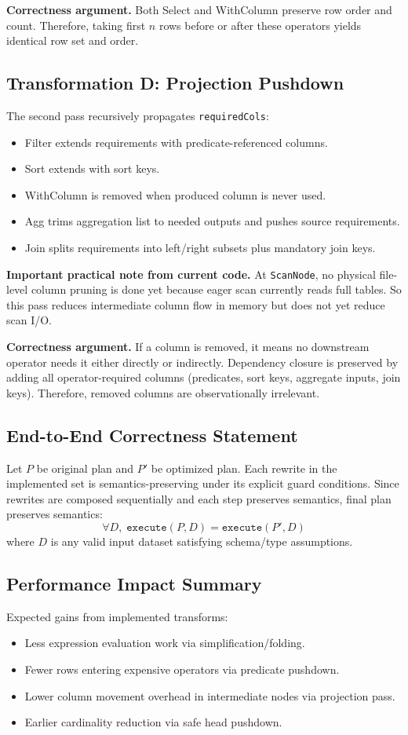 \documentclass[11pt,a4paper]{article}
\begin{document}
\textbf{Correctness argument.}
Both Select and WithColumn preserve row order and count. Therefore, taking first \(n\) rows before or after these operators yields identical row set and order.

\subsection{Transformation D: Projection Pushdown}
The second pass recursively propagates \texttt{requiredCols}:
\begin{itemize}[leftmargin=*]
	\item Filter extends requirements with predicate-referenced columns.
	\item Sort extends with sort keys.
	\item WithColumn is removed when produced column is never used.
	\item Agg trims aggregation list to needed outputs and pushes source requirements.
	\item Join splits requirements into left/right subsets plus mandatory join keys.
\end{itemize}

\textbf{Important practical note from current code.}
At \texttt{ScanNode}, no physical file-level column pruning is done yet because eager scan currently reads full tables. So this pass reduces intermediate column flow in memory but does not yet reduce scan I/O.

\textbf{Correctness argument.}
If a column is removed, it means no downstream operator needs it either directly or indirectly. Dependency closure is preserved by adding all operator-required columns (predicates, sort keys, aggregate inputs, join keys). Therefore, removed columns are observationally irrelevant.

\subsection{End-to-End Correctness Statement}
Let \(P\) be original plan and \(P'\) be optimized plan. Each rewrite in the implemented set is semantics-preserving under its explicit guard conditions. Since rewrites are composed sequentially and each step preserves semantics, final plan preserves semantics:
\[
\forall D,\; \texttt{execute}(P, D) = \texttt{execute}(P', D)
\]
where \(D\) is any valid input dataset satisfying schema/type assumptions.

\subsection{Performance Impact Summary}
Expected gains from implemented transforms:
\begin{itemize}[leftmargin=*]
	\item Less expression evaluation work via simplification/folding.
	\item Fewer rows entering expensive operators via predicate pushdown.
	\item Lower column movement overhead in intermediate nodes via projection pass.
	\item Earlier cardinality reduction via safe head pushdown.
\end{itemize}
\end{document}
